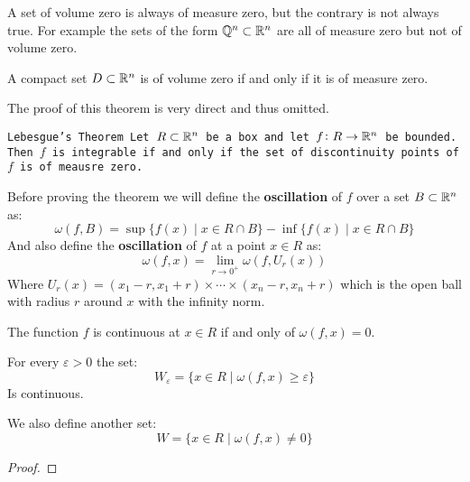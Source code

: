\documentclass[11pt,a4paper]{article}
\begin{document}
	\begin{remark}
		A set of volume zero is always of measure zero, but the
		contrary is not always true. For example the sets of the
		form $\mathbb{Q}^n \subset \mathbb{R}^n$ are all of measure zero but not
		of volume zero.
	\end{remark}
	\begin{theorem}
		A compact set $D \subset \mathbb{R}^n$ is of volume zero if and only
		if it is of measure zero.
	\end{theorem}
	The proof of this theorem is very direct and thus omitted.
	\begin{theorem}
		\tt{Lebesgue's Theorem} Let $R \subset \mathbb{R}^n$ be 
		a box and let $f \colon R \to \mathbb{R}^n$ be bounded. Then $f$ is integrable
		if and only if the set of discontinuity points of $f$ is of 
		meausre zero.
	\end{theorem}
	\noindent
	Before proving the theorem we will define the \textbf{oscillation}
	of $f$ over a set $B \subset \mathbb{R}^n$ as:
	\[
		\omega(f,B) = 
		\sup\{f(x) \mid x \in R \cap B\} -
		\inf\{f(x) \mid x \in R \cap B\}
	\]
	And also define the \textbf{oscillation} of $f$ at a point 
	$x \in R$ as:
	\[
		\omega(f,x) = \lim_{r \to 0^+}{\omega(f,U_r(x))}
	\]
	Where $U_r(x) = (x_1-r,x_1+r) \times \cdots \times (x_n-r,x_n+r)$
	which is the open ball with radius $r$ around $x$ with the
	infinity norm.
	\begin{lemma}
		The function $f$ is continuous at $x \in R$ if and only of
		$\omega(f,x) = 0$.
	\end{lemma}
	\begin{lemma}
		For every $\varepsilon > 0$ the set:
		\[
			W_\varepsilon = 
			\{x \in R \mid \omega(f,x) \geq \varepsilon\}
		\]
		Is continuous.
	\end{lemma}
	We also define another set:
	\[
		W = \{x \in R \mid \omega(f,x) \neq 0\}		
	\]
	\begin{proof}
	\end{proof}
	
\end{document}
